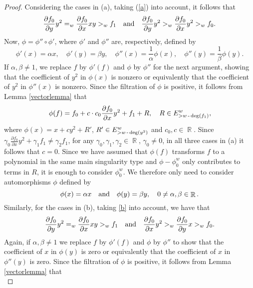 \documentclass[noend]{amsproc}
\theoremstyle{definition}
\DeclareMathOperator{\R}{\mathbb{R}}
\DeclareMathOperator{\dash}{\textnormal{-}}
\begin{document}
\begin{proof}
Considering the cases in (a), taking  (\ref{a}) into account, it follows that
\begin{equation*}
\frac{\partial f_0}{\partial y}y^2 =_w \frac{\partial f_0}{\partial x}xy>_w f_1\quad\textnormal{and}\quad \frac{\partial f_0}{\partial y}y^2>_w \frac{\partial f_0}{\partial x}y^2>_w f_0.
\end{equation*}
Now, $\phi=\phi''\circ\phi'$, where $\phi'$ and $\phi''$ are, respectively, defined by
\[\phi'(x)=\alpha x,\quad \phi'(y)=\beta y, \quad \phi''(x)=\frac{1}{\alpha}\phi(x), \quad\phi''(y)=\frac{1}{\beta}\phi(y).\]
If $\alpha,\beta\neq 1$, we replace $f$ by $\phi'(f)$ and $\phi$ by $\phi''$ for the next argument, showing that the coefficient of $y^2$ in $\phi(x)$ is nonzero or equivalently that the coefficient of $y^2$ in $\phi''(x)$ is nonzero.
Since the filtration of $\phi$ is positive, it follows from Lemma \ref{vectorlemma} that
\begin{equation*}
\phi(f) = f_0+c\cdot c_0\frac{\partial f_0}{\partial x}y^2+f_1+R,\quad R\in E^w_{>w\dash\deg(f_1)},
\end{equation*}
where $\phi(x) = x+cy^2+R'$, $R'\in E^w_{>w\dash\deg(y^2)}$ and $c_0,c\in\R$.
Since $\gamma_0\frac{\partial f_0}{\partial x}y^2+\gamma_1f_1\neq \gamma_2f_1$, for any $\gamma_0,\gamma_1,\gamma_2\in\R$, $\gamma_0\neq 0$, in all three cases in (a) it follows that $c=0$. Since we have assumed that $\phi(f)$ transforms $f$ to a polynomial in the same main singularity type and $\phi-\phi_0^w$ only contributes to terms in $R$, it is enough to consider $\phi_0^w$. We therefore only need to consider automorphisms $\phi$ defined by 
\begin{equation}\label{trans1}
\phi(x)=\alpha x\quad\textnormal{and}\quad\phi(y)=\beta y,\quad0\neq\alpha,\beta\in\R.
\end{equation}
Similarly, for the cases in (b), taking \ref{b} into account, we have that
\begin{equation*}
\frac{\partial f_0}{\partial y}y^2 =_w \frac{\partial f_0}{\partial x}xy>_w f_1\quad\textnormal{and}\quad \frac{\partial f_0}{\partial x}y^2>_w \frac{\partial f_0}{\partial y}x>_w f_0.
\end{equation*}
Again, if $\alpha,\beta\neq 1$ we replace $f$ by $\phi'(f)$ and $\phi$ by $\phi''$ to show that the coefficient of $x$ in $\phi(y)$ is zero or equivalently that the coefficient of $x$ in $\phi''(y)$ is zero. Since the filtration of $\phi$ is positive, it follows from Lemma \ref{vectorlemma} that
\begin{equation*}

\end{equation*}
\end{proof}
\end{document}
